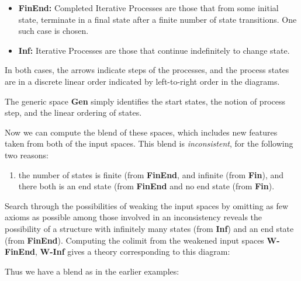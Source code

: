 
\begin{itemize}
\item  \textbf{FinEnd:} Completed Iterative Processes
are those that from some initial state, terminate in a final state
after a finite number of state transitions.  One such case is chosen.
\item 
\textbf{Inf:} Iterative Processes are those that continue indefinitely
to change state.
\end{itemize}
In both cases, the arrows indicate steps of the processes, and
the process states are in a discrete linear order indicated by left-to-right
order in the diagrams.

The generic space \textbf{Gen} simply identifies the start states, the
notion of process step, and the linear ordering of states.

Now we can compute the blend of these spaces,
which includes new features taken from both of the
input spaces.  This blend is \emph{inconsistent}, for the
following two reasons:
\begin{enumerate}
\item the number of states is finite (from \textbf{FinEnd}, and infinite
(from \textbf{Fin}), and there both is an end state (from \textbf{FinEnd}
and no end state (from \textbf{Fin}).
\end{enumerate}
Search through the possibilities of weaking the input spaces by
omitting as few axioms as possible among those involved
in an inconsistency reveals the possibility of a structure
with infinitely many states (from \textbf{Inf}) and an
end state (from \textbf{FinEnd}).  Computing the
colimit from the weakened input spaces \textbf{W-FinEnd}, \textbf{W-Inf}
gives a theory corresponding to this diagram:
\begin{center}
\end{center}
Thus we have a blend as in the earlier examples:

